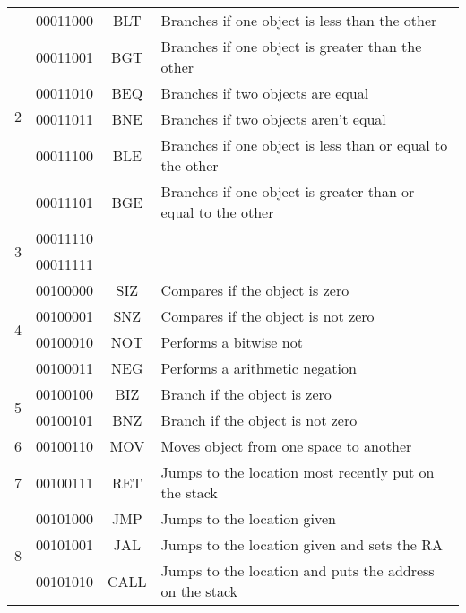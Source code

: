 \documentclass[12pt]{article}
\begin{document}
\begin{tabular}{| r | r | c | l |}
\hline
\multirow{6}{*}{2} & 00011000 & BLT & Branches if one object is less than the other\\
& 00011001 & BGT & Branches if one object is greater than the other\\
& 00011010 & BEQ & Branches if two objects are equal\\
& 00011011 & BNE & Branches if two objects aren't equal\\
& 00011100 & BLE & Branches if one object is less than or equal to the other\\
& 00011101 & BGE & Branches if one object is greater than or equal to the other\\
\hline
\multirow{2}{*}{3} & 00011110 & &\\
& 00011111 & &\\
\hline
\multirow{4}{*}{4} & 00100000 & SIZ & Compares if the object is zero\\
& 00100001 & SNZ & Compares if the object is not zero\\
& 00100010 & NOT & Performs a bitwise not\\
& 00100011 & NEG & Performs a arithmetic negation\\
\hline
\multirow{2}{*}{5} & 00100100 & BIZ & Branch if the object is zero\\
& 00100101 & BNZ & Branch if the object is not zero\\
\hline
6 & 00100110 & MOV & Moves object from one space to another\\
\hline
7 & 00100111 & RET & Jumps to the location most recently put on the stack\\
\hline
\multirow{3}{*}{8} & 00101000 & JMP & Jumps to the location given\\
& 00101001 & JAL & Jumps to the location given and sets the RA\\
& 00101010 & CALL & Jumps to the location and puts the address on the stack\\
\hline
\end{tabular}
\end{document}
